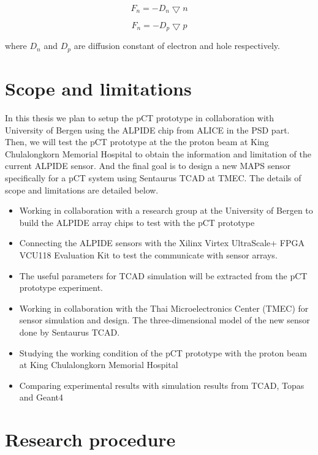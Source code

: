 \documentclass[12pt,a4paper]{article}
\begin{document}
\begin{equation}
    \label{eq:Fn}
    F_n = - D_n	\bigtriangledown n
\end{equation}

\begin{equation}
    \label{eq:Fp}
    F_n = - D_p	\bigtriangledown p
\end{equation}

where $D_n$ and $D_p$ are diffusion constant of electron and hole respectively.
\section{Scope and limitations}
In this thesis we plan to setup the pCT prototype in collaboration with University of Bergen using the ALPIDE chip from ALICE in the PSD part. Then, we will test the pCT prototype  at the the proton beam at King Chulalongkorn Memorial Hospital to obtain the information and limitation of the current ALPIDE sensor. And the final goal is to design a new MAPS sensor specifically for a pCT system using Sentaurus TCAD at TMEC. The details of scope and limitations are detailed below. 
 \begin{itemize}
      \item Working in collaboration with a research group at the University of Bergen to build the ALPIDE array chips to test with the  pCT prototype
      \item Connecting the ALPIDE sensors with the  Xilinx Virtex UltraScale+ FPGA VCU118 Evaluation Kit to test the communicate with  sensor arrays.
      \item The useful parameters for TCAD simulation will be extracted from the pCT prototype experiment.
      \item Working in collaboration with the Thai Microelectronics Center (TMEC) for sensor simulation and design. The three-dimensional model of the new sensor done by Sentaurus TCAD.
      \item Studying  the working condition of the pCT prototype with the proton beam at King Chulalongkorn Memorial Hospital 
      \item Comparing experimental results with simulation results from TCAD, Topas and Geant4
 \end{itemize}



\section{Research procedure}
\end{document}
